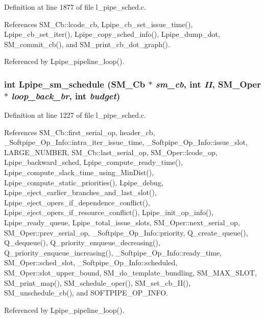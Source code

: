 Definition at line 1877 of file l\_\-pipe\_\-sched.c.

References SM\_\-Cb::lcode\_\-cb, Lpipe\_\-cb\_\-set\_\-issue\_\-time(), Lpipe\_\-cb\_\-set\_\-iter(), Lpipe\_\-copy\_\-sched\_\-info(), Lpipe\_\-dump\_\-dot, SM\_\-commit\_\-cb(), and SM\_\-print\_\-cb\_\-dot\_\-graph().

Referenced by Lpipe\_\-pipeline\_\-loop().
\subsubsection{\setlength{\rightskip}{0pt plus 5cm}int Lpipe\_\-sm\_\-schedule (\bf{SM\_\-Cb} $\ast$ {\em sm\_\-cb}, int {\em II}, \bf{SM\_\-Oper} $\ast$ {\em loop\_\-back\_\-br}, int {\em budget})}\label{l__pipe__sched_8c_01e3114cfbc096dc1fce4b7ee4039a61}




Definition at line 1227 of file l\_\-pipe\_\-sched.c.

References SM\_\-Cb::first\_\-serial\_\-op, header\_\-cb, \_\-Softpipe\_\-Op\_\-Info::intra\_\-iter\_\-issue\_\-time, \_\-Softpipe\_\-Op\_\-Info::issue\_\-slot, LARGE\_\-NUMBER, SM\_\-Cb::last\_\-serial\_\-op, SM\_\-Oper::lcode\_\-op, Lpipe\_\-backward\_\-sched, Lpipe\_\-compute\_\-ready\_\-time(), Lpipe\_\-compute\_\-slack\_\-time\_\-using\_\-Min\-Dist(), Lpipe\_\-compute\_\-static\_\-priorities(), Lpipe\_\-debug, Lpipe\_\-eject\_\-earlier\_\-branches\_\-and\_\-last\_\-slot(), Lpipe\_\-eject\_\-opers\_\-if\_\-dependence\_\-conflict(), Lpipe\_\-eject\_\-opers\_\-if\_\-resource\_\-conflict(), Lpipe\_\-init\_\-op\_\-info(), Lpipe\_\-ready\_\-queue, Lpipe\_\-total\_\-issue\_\-slots, SM\_\-Oper::next\_\-serial\_\-op, SM\_\-Oper::prev\_\-serial\_\-op, \_\-Softpipe\_\-Op\_\-Info::priority, Q\_\-create\_\-queue(), Q\_\-dequeue(), Q\_\-priority\_\-enqueue\_\-decreasing(), Q\_\-priority\_\-enqueue\_\-increasing(), \_\-Softpipe\_\-Op\_\-Info::ready\_\-time, SM\_\-Oper::sched\_\-slot, \_\-Softpipe\_\-Op\_\-Info::scheduled, SM\_\-Oper::slot\_\-upper\_\-bound, SM\_\-do\_\-template\_\-bundling, SM\_\-MAX\_\-SLOT, SM\_\-print\_\-map(), SM\_\-schedule\_\-oper(), SM\_\-set\_\-cb\_\-II(), SM\_\-unschedule\_\-cb(), and SOFTPIPE\_\-OP\_\-INFO.

Referenced by Lpipe\_\-pipeline\_\-loop().
